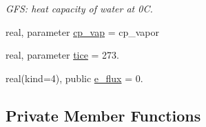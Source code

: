 \begin{DoxyCompactItemize}
\begin{DoxyCompactList}\small\item\em G\-F\-S\-: heat capacity of water at 0\-C. \end{DoxyCompactList}\item 
real, parameter \hyperlink{classfv__mapz__mod_aefa9aa99fd17c4042bf8dab0df746acc}{cp\-\_\-vap} = cp\-\_\-vapor
\item 
real, parameter \hyperlink{classfv__mapz__mod_a79c88aa388441e010f8532f6802b3240}{tice} = 273.
\item 
real(kind=4), public \hyperlink{classfv__mapz__mod_a5f144b640540ec10df24f75e367c2057}{e\-\_\-flux} = 0.
\end{DoxyCompactItemize}
\subsection*{Private Member Functions}
